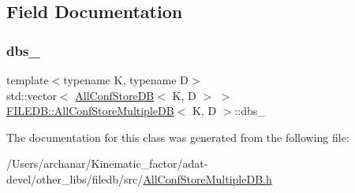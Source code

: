 \subsection{Field Documentation}
\mbox{\label{classFILEDB_1_1AllConfStoreMultipleDB_ae3a7f9bd3ad0f4bb998e8880b81305c2}} 
\subsubsection{\texorpdfstring{dbs\_}{dbs\_}}
{\footnotesize\ttfamily template$<$typename K, typename D$>$ \\
std\+::vector$<$ \mbox{\hyperlink{classFILEDB_1_1AllConfStoreDB}{All\+Conf\+Store\+DB}}$<$ K, D $>$ $>$ \mbox{\hyperlink{classFILEDB_1_1AllConfStoreMultipleDB}{F\+I\+L\+E\+D\+B\+::\+All\+Conf\+Store\+Multiple\+DB}}$<$ K, D $>$\+::dbs\+\_\+\hspace{0.3cm}{\ttfamily [protected]}}



The documentation for this class was generated from the following file\+:\begin{DoxyCompactItemize}
\item 
/\+Users/archanar/\+Kinematic\+\_\+factor/adat-\/devel/other\+\_\+libs/filedb/src/\mbox{\hyperlink{adat-devel_2other__libs_2filedb_2src_2AllConfStoreMultipleDB_8h}{All\+Conf\+Store\+Multiple\+D\+B.\+h}}\end{DoxyCompactItemize}
